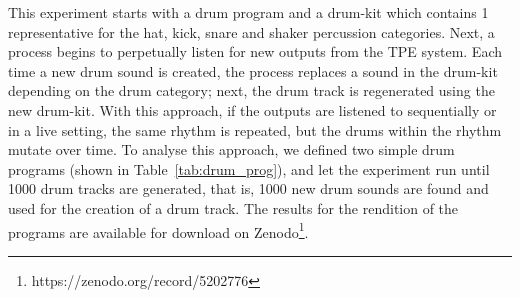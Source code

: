 \documentclass[\main/thesis.tex]{subfiles}
\begin{document}
This experiment starts with a drum program and a drum-kit which contains 1 representative for the hat, kick, snare and shaker percussion categories. Next, a process begins to perpetually listen for new outputs from the TPE system. Each time a new drum sound is created, the process replaces a sound in the drum-kit depending on the drum category; next, the drum track is regenerated using the new drum-kit. With this approach, if the outputs are listened to sequentially or in a live setting, the same rhythm is repeated, but the drums within the rhythm mutate over time. To analyse this approach, we defined two simple drum programs (shown in Table~\ref{tab:drum_prog}), and let the experiment run until 1000 drum tracks are generated, that is, 1000 new drum sounds are found and used for the creation of a drum track. The results for the rendition of the programs are available for download on Zenodo\footnote{https://zenodo.org/record/5202776}. 
\begin{table}[tbp]
\caption{\label{tab:drum_prog} Parameters for each drum program. A period (\enquote{.}) indicates no action}
\end{table}
\end{document}
